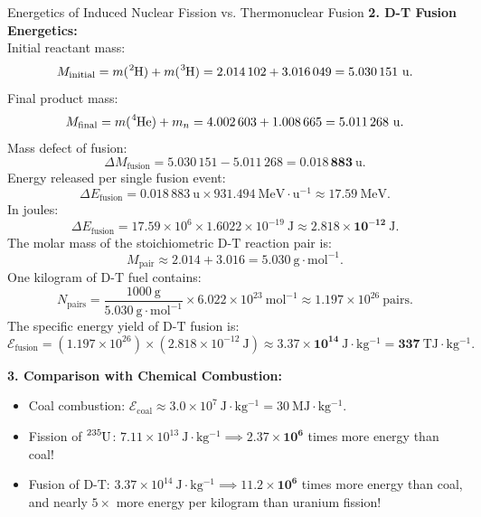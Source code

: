 \begin{workedexample}{Energetics of Induced Nuclear Fission vs. Thermonuclear Fusion}
\textbf{2. D-T Fusion Energetics:}\\
Initial reactant mass:
\[
M_{\text{initial}} = m(\ce{^2H}) + m(\ce{^3H}) = 2.014\,102 + 3.016\,049 = 5.030\,151\ \mathrm{u}.
\]
Final product mass:
\[
M_{\text{final}} = m(\ce{^4He}) + m_n = 4.002\,603 + 1.008\,665 = 5.011\,268\ \mathrm{u}.
\]
Mass defect of fusion:
\[
\Delta M_{\text{fusion}} = 5.030\,151 - 5.011\,268 = \mathbf{0.018\,883\ \mathrm{u}}.
\]
Energy released per single fusion event:
\[
\Delta E_{\text{fusion}} = 0.018\,883\ \mathrm{u} \times 931.494\ \mathrm{MeV\cdot u^{-1}} \approx \mathbf{17.59\ \mathrm{MeV}}.
\]
In joules:
\[
\Delta E_{\text{fusion}} = 17.59 \times 10^6 \times 1.6022 \times 10^{-19}\ \mathrm{J} \approx \mathbf{2.818 \times 10^{-12}\ \mathrm{J}}.
\]
The molar mass of the stoichiometric $\mathrm{D}$-$\mathrm{T}$ reaction pair is:
\[
M_{\text{pair}} \approx 2.014 + 3.016 = 5.030\ \mathrm{g\cdot mol^{-1}}.
\]
One kilogram of $\mathrm{D}$-$\mathrm{T}$ fuel contains:
\[
N_{\text{pairs}} = \frac{1000\ \mathrm{g}}{5.030\ \mathrm{g\cdot mol^{-1}}} \times 6.022 \times 10^{23}\ \mathrm{mol^{-1}} \approx 1.197 \times 10^{26}\ \text{pairs}.
\]
The specific energy yield of $\mathrm{D}$-$\mathrm{T}$ fusion is:
\[
\mathcal{E}_{\text{fusion}} = (1.197 \times 10^{26}) \times (2.818 \times 10^{-12}\ \mathrm{J}) \approx \mathbf{3.37 \times 10^{14}\ \mathrm{J\cdot kg^{-1}} = 337\ \mathrm{TJ\cdot kg^{-1}}}.
\]

\textbf{3. Comparison with Chemical Combustion:}\\
\begin{itemize}[leftmargin=1.5em,itemsep=2pt]
  \item Coal combustion: $\mathcal{E}_{\text{coal}} \approx 3.0 \times 10^7\ \mathrm{J\cdot kg^{-1}} = 30\ \mathrm{MJ\cdot kg^{-1}}$.
  \item Fission of $\ce{^{235}U}$: $7.11 \times 10^{13}\ \mathrm{J\cdot kg^{-1}} \implies \mathbf{2.37 \times 10^6}$ times more energy than coal!
  \item Fusion of $\mathrm{D}$-$\mathrm{T}$: $3.37 \times 10^{14}\ \mathrm{J\cdot kg^{-1}} \implies \mathbf{11.2 \times 10^6}$ times more energy than coal, and nearly $5\times$ more energy per kilogram than uranium fission!
\end{itemize}
\end{workedexample}
